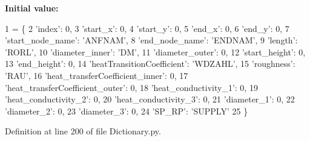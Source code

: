 {\bfseries Initial value\+:}
\begin{DoxyCode}
1 =  \{
2                                 \textcolor{stringliteral}{'index'}: 0,
3                                 \textcolor{stringliteral}{'start\_x'}: 0,
4                                 \textcolor{stringliteral}{'start\_y'}: 0,
5                                 \textcolor{stringliteral}{'end\_x'}: 0,
6                                 \textcolor{stringliteral}{'end\_y'}: 0,
7                                 \textcolor{stringliteral}{'start\_node\_name'}: \textcolor{stringliteral}{'ANFNAM'},
8                                 \textcolor{stringliteral}{'end\_node\_name'}: \textcolor{stringliteral}{'ENDNAM'},
9                                 \textcolor{stringliteral}{'length'}: \textcolor{stringliteral}{'RORL'},
10                                 \textcolor{stringliteral}{'diameter\_inner'}: \textcolor{stringliteral}{'DM'},
11                                 \textcolor{stringliteral}{'diameter\_outer'}: 0,
12                                 \textcolor{stringliteral}{'start\_height'}: 0,
13                                 \textcolor{stringliteral}{'end\_height'}: 0,
14                                 \textcolor{stringliteral}{'heatTransitionCoefficient'}: \textcolor{stringliteral}{'WDZAHL'},
15                                 \textcolor{stringliteral}{'roughness'}: \textcolor{stringliteral}{'RAU'},
16                                 \textcolor{stringliteral}{'heat\_transferCoefficient\_inner'}: 0,
17                                 \textcolor{stringliteral}{'heat\_transferCoefficient\_outer'}: 0,
18                                 \textcolor{stringliteral}{'heat\_conductivity\_1'}: 0,
19                                 \textcolor{stringliteral}{'heat\_conductivity\_2'}: 0,
20                                 \textcolor{stringliteral}{'heat\_conductivity\_3'}: 0,
21                                 \textcolor{stringliteral}{'diameter\_1'}: 0,
22                                 \textcolor{stringliteral}{'diameter\_2'}: 0,
23                                 \textcolor{stringliteral}{'diameter\_3'}: 0,
24                                 \textcolor{stringliteral}{'SP\_RP'}: \textcolor{stringliteral}{'SUPPLY'}
25                                 \}
\end{DoxyCode}


Definition at line 200 of file Dictionary.\+py.

\mbox{\label{namespace_dictionary_a87613937e78bcf53500a014dfffc9bef}} 
